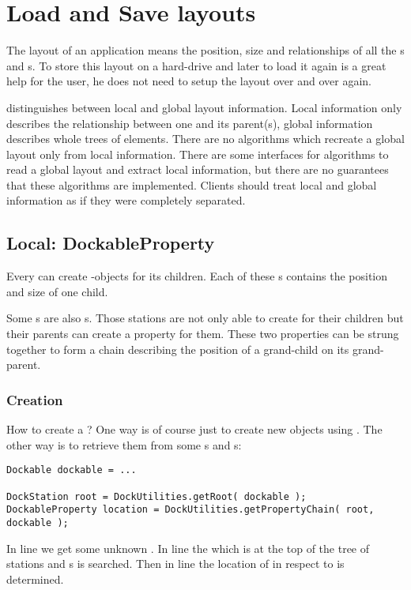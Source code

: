 \section{Load and Save layouts}
The layout of an application means the position, size and relationships of all the s and s. To store this layout on a hard-drive and later to load it again is a great help for the user, he does not need to setup the layout over and over again.

 distinguishes between local and global layout information. Local information only describes the relationship between one  and its parent(s), global information describes whole trees of elements. There are no algorithms which recreate a global layout only from local information. There are some interfaces for algorithms to read a global layout and extract local information, but there are no guarantees that these algorithms are implemented. Clients should treat local and global information as if they were completely separated.

\subsection{Local: DockableProperty}
Every  can create -objects for its children. Each of these s contains the position and size of one child. 

Some s are also s. Those stations are not only able to create  for their children but their parents can create a property for them. These two properties can be strung together to form a chain describing the position of a grand-child on its grand-parent.

\subsubsection{Creation}
How to create a ? One way is of course just to create new objects using . The other way is to retrieve them from some s and s:
\begin{lstlisting}
Dockable dockable = ...

DockStation root = DockUtilities.getRoot( dockable );
DockableProperty location = DockUtilities.getPropertyChain( root, dockable );
\end{lstlisting}
In line  we get some unknown . In line  the  which is at the top of the tree of stations and s is searched. Then in line  the location of  in respect to  is determined.

